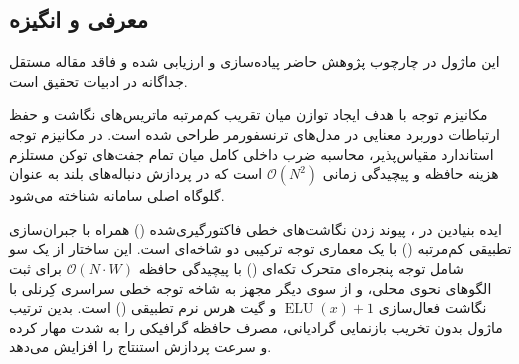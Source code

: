 \subsection{معرفی و انگیزه}
این ماژول در چارچوب پژوهش حاضر پیاده‌سازی و ارزیابی شده و فاقد مقاله مستقل جداگانه در ادبیات تحقیق است.

مکانیزم توجه  با هدف ایجاد توازن میان تقریب کم‌مرتبه ماتریس‌های نگاشت و حفظ ارتباطات دوربرد معنایی در مدل‌های ترنسفورمر طراحی شده است. در مکانیزم توجه استاندارد مقیاس‌پذیر، محاسبه ضرب داخلی کامل میان تمام جفت‌های توکن مستلزم هزینه حافظه و پیچیدگی زمانی $\mathcal{O}(N^2)$ است که در پردازش دنباله‌های بلند به عنوان گلوگاه اصلی سامانه شناخته می‌شود.

ایده بنیادین در ، پیوند زدن نگاشت‌های خطی فاکتورگیری‌شده () همراه با جبران‌سازی تطبیقی کم‌مرتبه () با یک معماری توجه ترکیبی دو شاخه‌ای است. این ساختار از یک سو شامل توجه پنجره‌ای متحرک تکه‌ای () با پیچیدگی حافظه $\mathcal{O}(N \cdot W)$ برای ثبت الگوهای نحوی محلی، و از سوی دیگر مجهز به شاخه توجه خطی سراسری کِرنلی با نگاشت فعال‌سازی $\operatorname{ELU}(x) + 1$ و گیت هرس نرم تطبیقی () است. بدین ترتیب ماژول بدون تخریب بازنمایی گرادیانی، مصرف حافظه گرافیکی را به شدت مهار کرده و سرعت پردازش استنتاج را افزایش می‌دهد.
